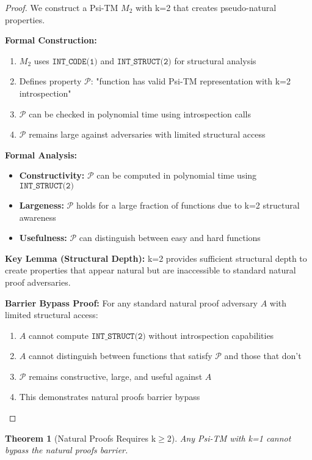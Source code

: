 \documentclass[11pt]{article}
\newtheorem{theorem}{Theorem}
\begin{document}
\begin{proof}
We construct a Psi-TM $M_2$ with k=2 that creates pseudo-natural properties.

\textbf{Formal Construction:}
\begin{enumerate}
\item $M_2$ uses $\texttt{INT\_CODE(1)}$ and $\texttt{INT\_STRUCT(2)}$ for structural analysis
\item Defines property $\mathcal{P}$: "function has valid Psi-TM representation with k=2 introspection"
\item $\mathcal{P}$ can be checked in polynomial time using introspection calls
\item $\mathcal{P}$ remains large against adversaries with limited structural access
\end{enumerate}

\textbf{Formal Analysis:}
\begin{itemize}
\item \textbf{Constructivity:} $\mathcal{P}$ can be computed in polynomial time using $\texttt{INT\_STRUCT(2)}$
\item \textbf{Largeness:} $\mathcal{P}$ holds for a large fraction of functions due to k=2 structural awareness
\item \textbf{Usefulness:} $\mathcal{P}$ can distinguish between easy and hard functions
\end{itemize}

\textbf{Key Lemma (Structural Depth):} k=2 provides sufficient structural depth to create properties that appear natural but are inaccessible to standard natural proof adversaries.

\textbf{Barrier Bypass Proof:}
For any standard natural proof adversary $A$ with limited structural access:
\begin{enumerate}
\item $A$ cannot compute $\texttt{INT\_STRUCT(2)}$ without introspection capabilities
\item $A$ cannot distinguish between functions that satisfy $\mathcal{P}$ and those that don't
\item $\mathcal{P}$ remains constructive, large, and useful against $A$
\item This demonstrates natural proofs barrier bypass
\end{enumerate}
\end{proof}

\begin{theorem}[Natural Proofs Requires k$\geq$2]
\label{thm:natural-proofs-k1}
Any Psi-TM with k=1 cannot bypass the natural proofs barrier.
\end{theorem}
\end{document}
